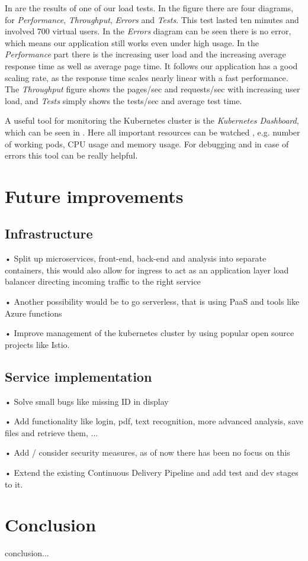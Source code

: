 \documentclass[conference]{IEEEtran}
\begin{document}
In  are the results of one of our load tests. In the figure there are four diagrams, for \textit{Performance}, \textit{Throughput}, \textit{Errors} and \textit{Tests}. This test lasted ten minutes and involved 700 virtual users. In the \textit{Errors} diagram can be seen there is no error, which means our application still works even under high usage. In the \textit{Performance} part there is the increasing user load and the increasing average response time as well as average page time. It follows our application has a good scaling rate, as the response time scales nearly linear with a fast performance. The \textit{Throughput} figure shows the pages/sec and requests/sec with increasing user load, and \textit{Tests} simply shows the tests/sec and average test time.

A useful tool for monitoring the Kubernetes cluster is the \textit{Kubernetes Dashboard}, which can be seen in . Here all important resources can be watched , e.g. number of working pods, CPU usage and memory usage. For debugging and in case of errors this tool can be really helpful.

\section{Future improvements}
\label{sec:future-improvements}
\subsection{Infrastructure}
•	Split up microservices, front-end, back-end and analysis into separate containers, this would also allow for ingress to act as an application layer load balancer directing incoming traffic to the right service

•	Another possibility would be to go serverless, that is using PaaS and tools like Azure functions

•	Improve management of the kubernetes cluster by using popular open source projects like Istio.

\subsection{Service implementation}
•	Solve small bugs like missing ID in display

•	Add functionality like login, pdf, text recognition, more advanced analysis, save files and retrieve them, ...

•	Add / consider security measures, as of now there has been no focus on this

•	Extend the existing Continuous Delivery Pipeline and add test and dev stages to it.

\section{Conclusion}
\label{sec:conclusion}
conclusion...



\end{document}
